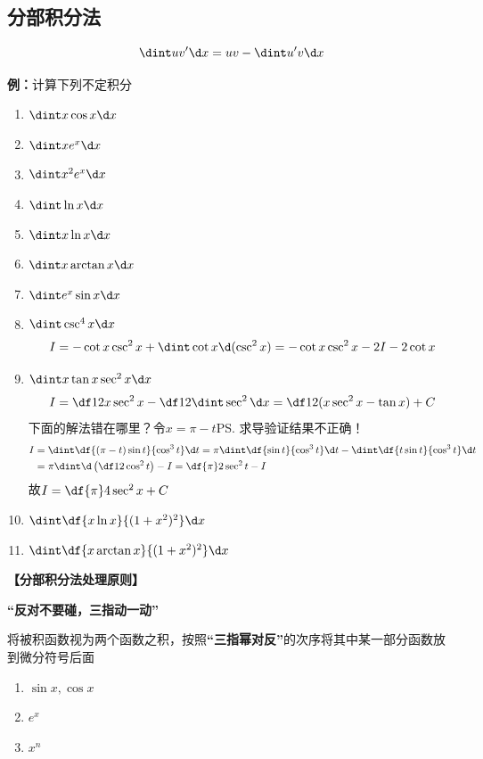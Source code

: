 \subsection{分部积分法}

$$\dint uv'\d x=uv-\dint u'v\d x$$

{\bf 例：}计算下列不定积分
\begin{enumerate}[(1)]
  \setlength{\itemindent}{1cm}
  \item $\dint x\cos x\d x$ 
  \item $\dint xe^x\d x$ 
  \item $\dint x^2e^x\d x$ 
  \item $\dint\ln x\d x$
  \item $\dint x\ln x\d x$ 
  \item $\dint x\arctan x\d x$ 
  \item $\dint e^x\sin x\d x$
  \item $\dint\csc^4x\d x$\\
  $$I=-\cot x\csc^2x+\dint\cot x\d(\csc^2x)=-\cot x\csc^2x-2I-2\cot x$$
  \item $\dint x\tan x\sec^2x\d x$
  $$I=\df12x\sec^2x-\df12\dint\sec^2\d x=\df12(x\sec^2x-\tan x)+C$$
  下面的解法错在哪里？令$x=\pi-t$\ps{求导验证结果不正确！}{\b
  \begin{align}
  I&=\dint\df{(\pi-t)\sin t}{\cos^3t}\d t=\pi\dint\df{\sin t}{\cos^3t}\d t
  -\dint\df{t\sin t}{\cos^3t}\d t\notag\\
  &=\pi\dint\d\left(\df1{2\cos^2t}\right)-I=\df{\pi}2\sec^2t-I\notag
  \end{align}
  故$I=\df{\pi}4\sec^2x+C$}
  \item $\dint\df{x\ln x}{(1+x^2)^2}\d x$
  \item $\dint\df{x\arctan x}{(1+x^2)^2}\d x$
\end{enumerate}

\begin{shaded}
{\bf 【分部积分法处理原则】}
\begin{center}
	{\bf “{反对}不要碰，{三指}动一动”} 
\end{center}
将被积函数视为两个函数之积，按照{\bf{“三指幂对反”}}的次序将其中某一部分函数放到微分符号后面 
\begin{enumerate}
  \item $\sin x,\cos x$ 
  \item $e^x$ 
  \item $x^n$
\end{enumerate}
\end{shaded}

